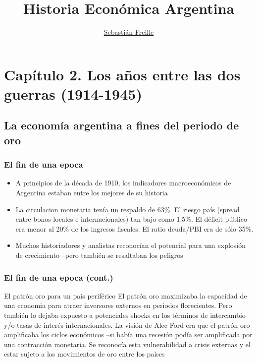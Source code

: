 \documentclass[14pt,aspectratio=169]{beamer}
\title{Historia Económica Argentina}
\author{\underline{Sebastián Freille} \inst{1}}
\institute[shortinst]{\inst{1} IEF-UNC \\ UCC}
\date{}
\begin{document}
{
  \begin{frame}
    \titlepage
  \end{frame}
}

  
  \section{Capítulo 2. Los años entre las dos guerras (1914-1945)}


  \subsection{La economía argentina a fines del periodo de oro}


 \begin{frame}\frametitle{El fin de una epoca}
    \begin{itemize}\itemsep 10pt
      \item A principios de la década de 1910, los indicadores
        macroeconómicos de Argentina estaban entre los mejores de su
        historia
        \item La circulacion monetaria tenía un respaldo de 63\%. El
          riesgo país (spread entre bonos locales e internacionales)
          tan bajo como 1.5\%. El déficit público era menor al 20\% de
          los ingresos fiscales. El ratio deuda/PBI era de sólo 35\%.
          \item Muchos historiadores y analistas reconocían el
            potencial para una explosión de crecimiento --pero
            también se resaltaban los peligros
       \end{itemize}
      \end{frame}
  


 \begin{frame}\frametitle{El fin de una epoca (cont.)}
   \begin{block}{El patrón oro para un país periférico}
El patrón oro maximizaba la capacidad de una economia para atraer
inversores externos en periodos florecientes. Pero también lo dejaba
expuesto a potenciales shocks en los términos de intercambio y/o tasas
de interés internacionales. La visión de Alec Ford era que el patrón
oro amplificaba los ciclos económicos --si había una recesión podía
ser amplificada por una contracción monetaria. Se reconocía esta
vulnerabilidad a crisis externas y el estar sujeto a los movimientos
de oro entre los países
     \end{block}
      \end{frame}
  
\end{document}
